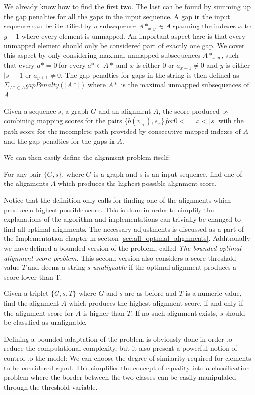 \documentclass[thesis.tex]{subfiles}
\begin{document}
{\begin{enumerate}
\end{enumerate}
We already know how to find the first two. The last can be found by summing up the gap penalties for all the gaps in the input sequence. A gap in the input sequence can be identified by a subsequence $A*_{x:y} \in A$ spanning the indexes $x$ to $y-1$ where every element is unmapped. An important aspect here is that every unmapped element should only be considered part of exactly one gap. We cover this aspect by only considering maximal unmapped subsequences $A*_{x:y}$, such that every $a*=0$ for every $a* \in A*$ and $x$ is either $0$ or $a_{x-1} \neq 0$ and $y$ is either $|s|-1$ or $a_{y+1} \neq 0$. The gap penalties for gaps in the string is then defined as $\Sigma_{A* \in A} gapPenalty(|A*|)$ where $A*$ is the maximal unmapped subsequences of $A$.
\begin{defn}
  Given a sequence $s$, a graph $G$ and an alignment $A$, the score produced by combining mapping scores for the pairs $\{b(v_{a_x}), s_x\} for 0<=x<|s|$ with the path score for the incomplete path provided by consecutive mapped indexes of $A$ and the gap penalties for the gaps in $A$.
\end{defn}
We can then easily define the alignment problem itself:
\begin{defn}
  For any pair $\{G, s\}$, where $G$ is a graph and $s$ is an input sequence, find one of the alignments $A$ which produces the highest possible alignment score.
\end{defn}
Notice that the definition only calls for finding one of the alignments which produce a highest possible score. This is done in order to simplify the explanations of the algorithm and implementations can trivially be changed to find all optimal alignments. The necessary adjustments is discussed as a part of the Implementation chapter in section \ref{sec:all_optimal_alignments}. Additionally we have defined a bounded version of the problem, called \textit{The bounded optimal alignment score problem}. This second version also considers a score threshold value $T$ and deems a string $s$ \textit{unalignable} if the optimal alignment produces a score lower than T.
\begin{defn}
  \label{def:bounded_alignment_problem}
  Given a triplet $\{G, s, T\}$ where $G$ and $s$ are as before and $T$ is a numeric value, find the alignment $A$ which produces the highest alignment score, if and only if the alignment score for $A$ is higher than $T$. If no such alignment exists, $s$ should be classified as unalignable.
\end{defn}
Defining a bounded adaptation of the problem is obviously done in order to reduce the computational complexity, but it also present a powerful notion of control to the model: We can choose the degree of similarity required for elements to be considered equal. This simplifies the concept of equality into a classification problem where the border between the two classes can be easily manipulated through the threshold variable.
}
\end{document}
